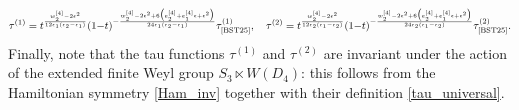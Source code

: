 \documentclass[12pt,a4paper]{article}
\numberwithin{equation}{section}
\begin{document}
\begin{equation}\label{conn_VI}
\tau^{(1)}=t^{\frac{w_2^{[4]}{-}2\epsilon^2}{12\epsilon_1(\epsilon_2{-}\epsilon_1)}}(1{-}t)^{-\frac{w_2^{[4]}{-}2\epsilon^2+6\big(e_2^{[4]}{+}e_1^{[4]}\epsilon{+}\epsilon^2\big)}{24\epsilon_1(\epsilon_2{-}\epsilon_1)}}\tau^{(1)}_{\textrm{\cite{BST25}}}, \quad \tau^{(2)}=t^{\frac{w_2^{[4]}{-}2\epsilon^2}{12\epsilon_2(\epsilon_1{-}\epsilon_2)}}(1{-}t)^{-\frac{w_2^{[4]}{-}2\epsilon^2+6\big(e_2^{[4]}{+}e_1^{[4]}\epsilon{+}\epsilon^2\big)}{24\epsilon_2(\epsilon_1{-}\epsilon_2)}}\tau^{(2)}_{\textrm{\cite{BST25}}}.
\end{equation} 
Finally, note that the tau functions $\tau^{(1)}$ and $\tau^{(2)}$ are invariant under the action of the extended finite Weyl group $S_3\ltimes W(D_4)$: this follows from the Hamiltonian symmetry \eqref{Ham_inv} together with their definition \eqref{tau_universal}.
\end{document}
